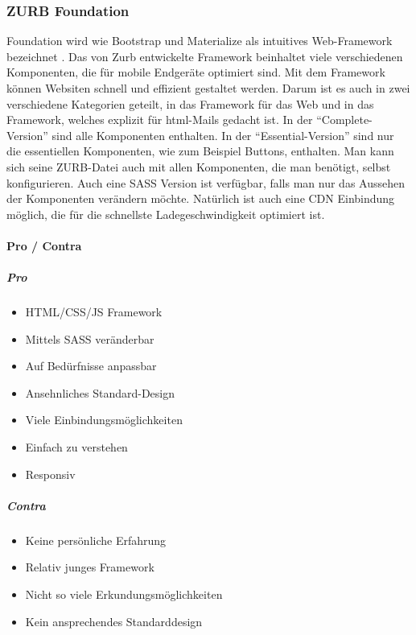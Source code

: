 		\subsubsection{ZURB Foundation}
		\label{chapter:study-frontend-frameworks-foundation}
		Foundation wird wie Bootstrap und Materialize als intuitives Web-Framework bezeichnet \cite{foundation-intro}. Das von Zurb entwickelte Framework beinhaltet viele verschiedenen Komponenten, die für mobile Endgeräte optimiert sind. Mit dem Framework können Websiten schnell und effizient gestaltet werden. Darum ist es auch in zwei verschiedene Kategorien geteilt, in das Framework für das Web und in das Framework, welches explizit für html-Mails gedacht ist. In der \enquote{Complete-Version} sind alle Komponenten enthalten. In der \enquote{Essential-Version} sind nur die essentiellen Komponenten, wie zum Beispiel Buttons, enthalten. Man kann sich seine ZURB-Datei auch mit allen Komponenten, die man benötigt, selbst konfigurieren. Auch eine SASS Version ist verfügbar, falls man nur das Aussehen der Komponenten verändern möchte. Natürlich ist auch eine CDN Einbindung möglich, die für die schnellste Ladegeschwindigkeit optimiert ist.
		\paragraph{Pro / Contra}
		\subparagraph{Pro}
		\begin{itemize}
			\item HTML/CSS/JS Framework
			\item Mittels SASS veränderbar
			\item Auf Bedürfnisse anpassbar
			\item Ansehnliches Standard-Design 
			\item Viele Einbindungsmöglichkeiten
			\item Einfach zu verstehen
			\item Responsiv
		\end{itemize}
	\label{list:zurbpro}
		\subparagraph{Contra}
		\begin{itemize}
			\item Keine persönliche Erfahrung
			\item Relativ junges Framework
			\item Nicht so viele Erkundungsmöglichkeiten
			\item Kein ansprechendes Standarddesign
		\end{itemize}
	\label{list:zurbcontra}


